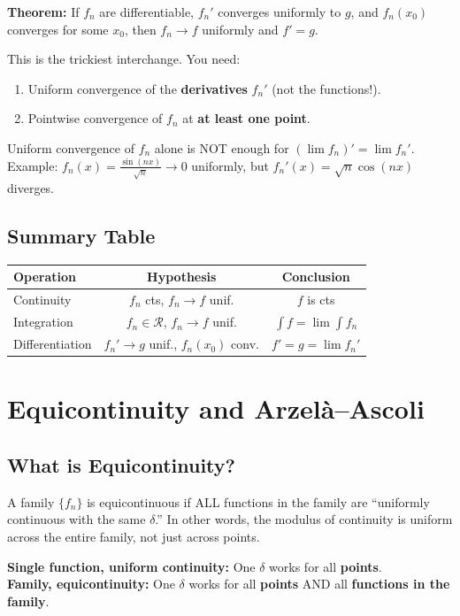 \documentclass[11pt]{article}
\theoremstyle{definition}
\begin{document}
\textbf{Theorem:} If $f_n$ are differentiable, $f_n'$ converges uniformly to $g$, and $f_n(x_0)$ converges for some $x_0$, then $f_n \to f$ uniformly and $f' = g$.

\begin{pitfall}
This is the trickiest interchange. You need:
\begin{enumerate}
\item Uniform convergence of the \textbf{derivatives} $f_n'$ (not the functions!).
\item Pointwise convergence of $f_n$ at \textbf{at least one point}.
\end{enumerate}

Uniform convergence of $f_n$ alone is NOT enough for $(\lim f_n)' = \lim f_n'$. Example: $f_n(x) = \frac{\sin(nx)}{\sqrt{n}} \to 0$ uniformly, but $f_n'(x) = \sqrt{n} \cos(nx)$ diverges.
\end{pitfall}

\subsection{Summary Table}

\begin{center}
\begin{tabular}{|l|c|c|}
\hline
\textbf{Operation} & \textbf{Hypothesis} & \textbf{Conclusion} \\
\hline
Continuity & $f_n$ cts, $f_n \to f$ unif. & $f$ is cts \\
Integration & $f_n \in \mathscr{R}$, $f_n \to f$ unif. & $\int f = \lim \int f_n$ \\
Differentiation & $f_n' \to g$ unif., $f_n(x_0)$ conv. & $f' = g = \lim f_n'$ \\
\hline
\end{tabular}
\end{center}

\section{Equicontinuity and Arzel\`a--Ascoli}

\subsection{What is Equicontinuity?}

\begin{intuition}
A family $\{f_n\}$ is equicontinuous if ALL functions in the family are ``uniformly continuous with the same $\delta$.'' In other words, the modulus of continuity is uniform across the entire family, not just across points.

\textbf{Single function, uniform continuity:} One $\delta$ works for all \textbf{points}.\\
\textbf{Family, equicontinuity:} One $\delta$ works for all \textbf{points} AND all \textbf{functions in the family}.
\end{intuition}
\end{document}
